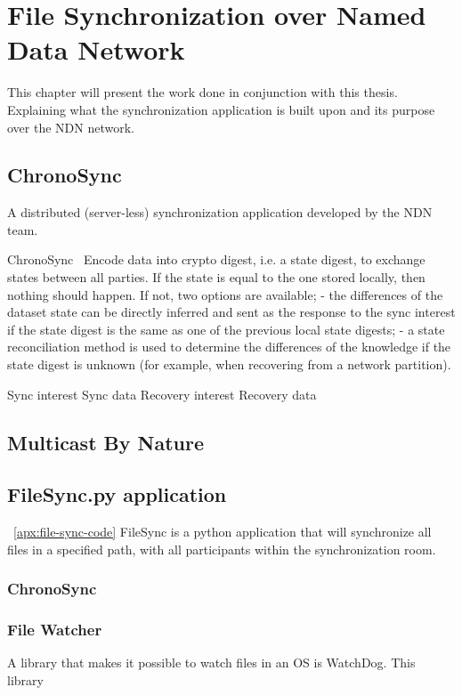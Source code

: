 \chapter{File Synchronization over Named Data Network}\label{chp3:application}
This chapter will present the work done in conjunction with this thesis. 
Explaining what the synchronization application is built upon and its purpose over the \gls{NDN} network. 

\section{ChronoSync}
A distributed (server-less) synchronization application developed by the \gls{NDN} team. 

ChronoSync~\cite{DBLP:conf/icnp/ZhuA13}
Encode data into crypto digest, i.e. a state digest, to exchange states between all parties. 
If the state is equal to the one stored locally, then nothing should happen.
If not, two options are available; 
- the differences of the dataset state can be directly inferred
and sent as the response to the sync interest if the state
digest is the same as one of the previous local state
digests;
- a state reconciliation method is used to determine the differences of the knowledge if the state digest is unknown
(for example, when recovering from a network partition).


Sync interest
Sync data
Recovery interest
Recovery data


\section{Multicast By Nature}


\section{FileSync.py application}
~\autoref{apx:file-sync-code}
FileSync is a python application that will synchronize all files in a specified path, with all participants within the synchronization room.


\subsection{ChronoSync}

\subsection{File Watcher}
A library that makes it possible to watch files in an \gls{OS} is WatchDog.
This library 

